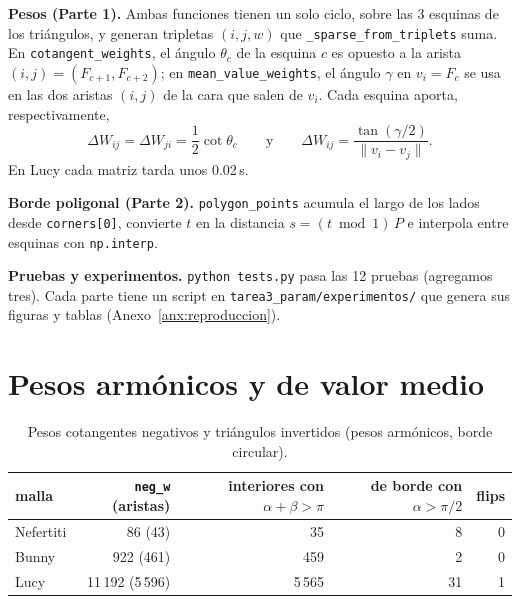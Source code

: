 \documentclass[
	spanish, %
	a4paper, oneside
]{article}
\newcommand{\code}[1]{\texttt{#1}}
\begin{document}
\templatePortrait

\templatePagecfg

\templateIndex

\templateFinalcfg


\textbf{Pesos (Parte 1).} Ambas funciones tienen un solo ciclo, sobre las 3 esquinas de los triángulos, y generan tripletas $(i,j,w)$ que \code{\_sparse\_from\_triplets} suma. En \code{cotangent\_weights}, el ángulo $\theta_c$ de la esquina $c$ es opuesto a la arista $(i,j)=(F_{c+1},F_{c+2})$; en \code{mean\_value\_weights}, el ángulo $\gamma$ en $v_i=F_c$ se usa en las dos aristas $(i,j)$ de la cara que salen de $v_i$. Cada esquina aporta, respectivamente,
\[
\Delta W_{ij}=\Delta W_{ji}=\frac12\cot\theta_c
\qquad\text{y}\qquad
\Delta W_{ij}=\frac{\tan(\gamma/2)}{\|v_i-v_j\|}.
\]
En Lucy cada matriz tarda unos 0.02\,s.

\textbf{Borde poligonal (Parte 2).} \code{polygon\_points} acumula el largo de los lados desde \code{corners[0]}, convierte $t$ en la distancia $s=(t \bmod 1)\,P$ e interpola entre esquinas con \code{np.interp}.

\textbf{Pruebas y experimentos.} \code{python tests.py} pasa las 12 pruebas (agregamos tres). Cada parte tiene un script en \code{tarea3\_param/experimentos/} que genera sus figuras y tablas (Anexo~\ref{anx:reproduccion}).

\section{Pesos armónicos y de valor medio}
\begin{table}[h]
\centering\small
\caption{Pesos cotangentes negativos y triángulos invertidos (pesos armónicos, borde circular).}
\label{tab:p1}
\begin{tabular}{lrrrr}
\toprule
malla & \code{neg\_w} (aristas) & interiores con $\alpha+\beta>\pi$ & de borde con $\alpha>\pi/2$ & flips \\
\midrule
Nefertiti & 86 (43) & 35 & 8 & 0 \\
Bunny & 922 (461) & 459 & 2 & 0 \\
Lucy & 11\,192 (5\,596) & 5\,565 & 31 & 1 \\
\bottomrule
\end{tabular}
\end{table}
\end{document}

